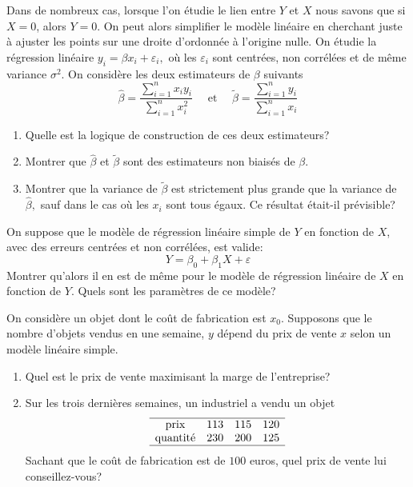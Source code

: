 \documentclass{td_um}
\providecommand{\1}{\mathds{1}}
\begin{document}
\cor{\newpage}

\exo{}
Dans de nombreux cas, lorsque l'on étudie le lien entre $Y$ et $X$ nous savons que si $X=0$, alors $Y=0$. On peut alors simplifier le modèle linéaire en cherchant juste à ajuster les points sur une droite d'ordonnée à l'origine nulle. On étudie la régression linéaire $y_{i}=\beta x_{i}+\varepsilon_{i},$ où les $\varepsilon_{i}$ sont centrées, non corrélées et de même variance $\sigma^{2}$. On considère les deux estimateurs de $\beta$ suivants
\[
\hat{\beta}=\frac{\sum_{i=1}^{n} x_{i} y_{i}}{\sum_{i=1}^{n} x_{i}^{2}} \quad \text { et } \quad \tilde{\beta}=\frac{\sum_{i=1}^{n} y_{i}}{\sum_{i=1}^{n} x_{i}}
\]
\begin{enumerate}
    \item  Quelle est la logique de construction de ces deux estimateurs?
    \item   Montrer que $\hat{\beta}$ et $\tilde{\beta}$ sont des estimateurs non biaisés de $\beta$.
    \item   Montrer que la variance de $\tilde{\beta}$ est strictement plus grande que la variance de
        $\hat{\beta},$ sauf dans le cas où les $x_{i}$ sont tous égaux. Ce résultat était-il prévisible?
\end{enumerate}


\cor{\newpage}

\exo{}
On suppose que le modèle de régression linéaire simple de $Y$ en fonction de $X$, avec des erreurs centrées et non corrélées, est valide:
\[
Y=\beta_{0}+\beta_{1} X+\varepsilon
\]
Montrer qu'alors il en est de même pour le modèle de régression linéaire de $X$ en fonction de $Y$. Quels sont les paramètres de ce modèle?


\cor{\newpage}

\exo{}
On considère un objet dont le coût de fabrication est $x_{0}$. Supposons que le nombre d'objets vendus en une semaine, $y$ dépend du prix de vente $x$ selon un modèle linéaire simple.
\begin{enumerate}
    \item  Quel est le prix de vente maximisant la marge de l'entreprise?
    \item  Sur les trois dernières semaines, un industriel a vendu un objet
    \[
            \begin{array}[]{cccc}
                \hline
                \text{prix} & 113 & 115 & 120 \\
                \text{quantité} & 230 & 200 & 125 \\
                \hline
            \end{array}
        \]
        Sachant que le coût de fabrication est de $100$ euros, quel prix de vente lui conseillez-vous?
\end{enumerate}
\end{document}
